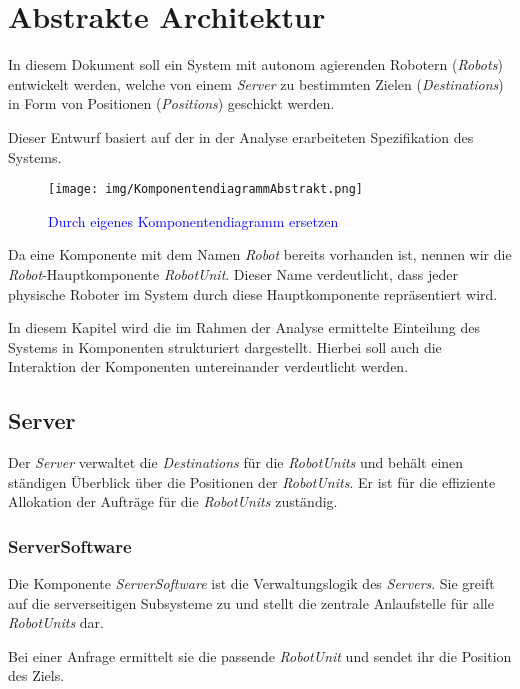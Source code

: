 \section{Abstrakte Architektur}
In diesem Dokument soll ein System mit autonom agierenden Robotern (\emph{Robots}) entwickelt werden, welche von einem \emph{Server} zu bestimmten Zielen (\emph{Destinations}) in Form von Positionen (\emph{Positions}) geschickt werden. 

Dieser Entwurf basiert auf der in der Analyse erarbeiteten Spezifikation des Systems.

\begin{figure}[H]
\centering
\texttt{[image: img/KomponentendiagrammAbstrakt.png]}
\caption{\textcolor{blue}{Durch eigenes Komponentendiagramm ersetzen}}
\label{KomponentendiagrammAbstrakt}
\end{figure}

Da eine Komponente mit dem Namen \emph{Robot} bereits vorhanden ist, nennen wir die \emph{Robot}-Hauptkomponente \emph{RobotUnit}. Dieser Name verdeutlicht, dass jeder physische Roboter im System durch diese Hauptkomponente repr\"{a}sentiert wird.


In diesem Kapitel wird die im Rahmen der Analyse ermittelte Einteilung des Systems in Komponenten strukturiert dargestellt. Hierbei soll auch die Interaktion der Komponenten untereinander verdeutlicht werden.

\subsection{Server}

Der \emph{Server} verwaltet die \emph{Destinations} f\"{u}r die \emph{RobotUnits} und beh\"{a}lt einen st\"{a}ndigen \"{U}berblick \"{u}ber die Positionen der \emph{RobotUnits}. Er ist f\"{u}r die effiziente Allokation der Auftr\"{a}ge f\"{u}r die \emph{RobotUnits} zust\"{a}ndig.

\subsubsection{ServerSoftware}

Die Komponente \emph{ServerSoftware} ist die Verwaltungslogik des \emph{Servers}. Sie greift auf die serverseitigen Subsysteme zu und stellt die zentrale Anlaufstelle f\"{u}r alle \emph{RobotUnits} dar. 

Bei einer Anfrage ermittelt sie die passende \emph{RobotUnit} und sendet ihr die Position des Ziels. 

